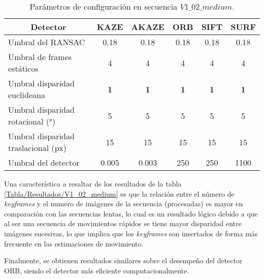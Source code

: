 \begin{table}[H]
	\caption{Parámetros de configuración  en secuencia $V1\_ 02\_ medium$.}
	\begin{tabular}{|l|c|c|c|c|c|}
		\hline
		\multicolumn{1}{|c|}{\textbf{Detector}} & \textbf{KAZE} & \textbf{AKAZE} & \textbf{ORB} & \textbf{SIFT} & \textbf{SURF} \\ \hline
		Umbral del RANSAC & 0.18 & 0.18 & 0.18 & 0.18 & 0.18 \\ \hline
		Umbral de frames estáticos & 4 & 4 & 4 & 4 & 4 \\ \hline
		Umbral disparidad euclideana & \textbf{1} & \textbf{1} & \textbf{1} & \textbf{1} & \textbf{1} \\ \hline
		Umbral disparidad rotacional (°) & 5 & 5 & 5 & 5 & 5 \\ \hline
		Umbral disparidad traslacional (px) & 15 & 15 & 15 & 15 & 15 \\ \hline
		Umbral del detector & 0.005 & 0.003 & 250 & 250 & 1100 \\ \hline
	\end{tabular}
	\label{Tabla/Parametros/V1_02_medium}
\end{table}

Una característica a resaltar de los resultados de la tabla \ref{Tabla/Resultados/V1_02_medium} es que la relación entre el número de \textit{keyframes} y el numero de imágenes de la secuencia (procesadas) es mayor en comparación con las secuencias lentas, lo cual es un resultado lógico debido a que al ser una secuencia de movimientos rápidos se tiene mayor disparidad entre imágenes sucesivas, lo que implica que los \textit{keyframes} son insertados de forma más frecuente en las estimaciones de movimiento.

Finalmente, se obtienen resultados similares sobre el desempeño del detector ORB, siendo el detector más eficiente computacionalmente.
 
